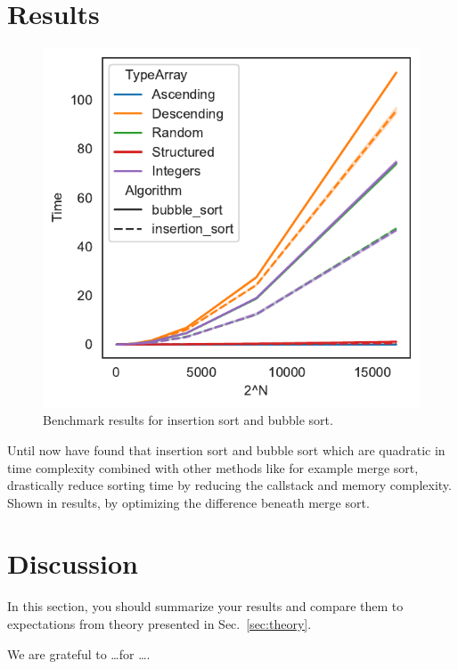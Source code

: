 \documentclass[sigconf, nonacm, natbib, screen, balance=False]{acmart}
\begin{document}
\section{Results}\label{sec:results}

\begin{figure}
  \centering
  \includegraphics{foo}
  \caption{Benchmark results for insertion sort and bubble sort.}
  \label{fig:bench}
\end{figure}

Until now have found that insertion sort and bubble sort which are quadratic in time complexity combined with other methods like for example merge sort, drastically reduce sorting time by reducing the callstack and memory complexity. Shown in results, by optimizing the difference beneath merge sort.

\section{Discussion}\label{sec:discussion}

In this section, you should summarize your results and compare them to
expectations from theory presented in Sec.~\ref{sec:theory}.

\begin{acks}
We are grateful to \dots for \dots.
\end{acks}






\end{document}
